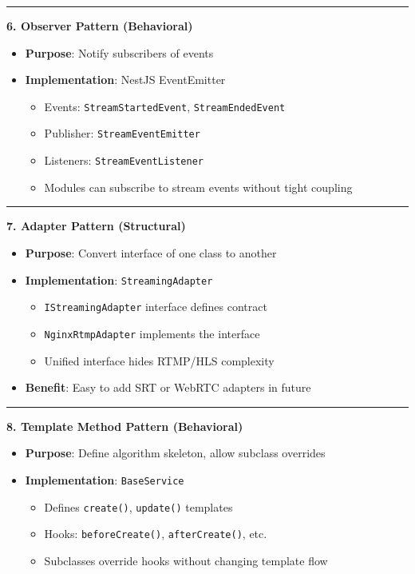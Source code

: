 \documentclass[10pt]{article}
\begin{document}
\begin{tcolorbox}[
  colback=white,
  colframe=dark,
  arc=3pt,
  boxrule=1pt,
  before skip=8pt,
  after skip=8pt
]
\hrule

\textbf{6. Observer Pattern (Behavioral)}
\begin{itemize}
\item \textbf{Purpose}: Notify subscribers of events
\item \textbf{Implementation}: NestJS EventEmitter
\begin{itemize}
\item Events: \texttt{StreamStartedEvent}, \texttt{StreamEndedEvent}
\item Publisher: \texttt{StreamEventEmitter}
\item Listeners: \texttt{StreamEventListener}
\item Modules can subscribe to stream events without tight coupling
\end{itemize}
\end{itemize}

\hrule

\textbf{7. Adapter Pattern (Structural)}
\begin{itemize}
\item \textbf{Purpose}: Convert interface of one class to another
\item \textbf{Implementation}: \texttt{StreamingAdapter}
\begin{itemize}
\item \texttt{IStreamingAdapter} interface defines contract
\item \texttt{NginxRtmpAdapter} implements the interface
\item Unified interface hides RTMP/HLS complexity
\end{itemize}
\item \textbf{Benefit}: Easy to add SRT or WebRTC adapters in future
\end{itemize}

\hrule

\textbf{8. Template Method Pattern (Behavioral)}
\begin{itemize}
\item \textbf{Purpose}: Define algorithm skeleton, allow subclass overrides
\item \textbf{Implementation}: \texttt{BaseService}
\begin{itemize}
\item Defines \texttt{create()}, \texttt{update()} templates
\item Hooks: \texttt{beforeCreate()}, \texttt{afterCreate()}, etc.
\item Subclasses override hooks without changing template flow
\end{itemize}
\end{itemize}

\end{tcolorbox}
\end{document}
